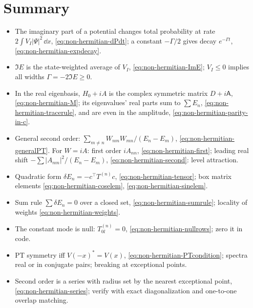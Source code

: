 \section{Summary}
\begin{itemize}
\item The imaginary part of a potential changes total probability at rate $2\int V_I|\Psi|^2\,\dd x$, \eqref{eq:non-hermitian-dPdt}; a constant $-\Gamma/2$ gives decay $e^{-\Gamma t}$, \eqref{eq:non-hermitian-expdecay}.
\item $\Im E$ is the state-weighted average of $V_I$, \eqref{eq:non-hermitian-ImE}; $V_I\le0$ implies all widths $\Gamma=-2\Im E\ge0$.
\item In the real eigenbasis, $H_0+iA$ is the complex symmetric matrix $D+i\mathsf A$, \eqref{eq:non-hermitian-M}; its eigenvalues' real parts sum to $\sum E_n$, \eqref{eq:non-hermitian-tracerule}, and are even in the amplitude, \eqref{eq:non-hermitian-parity-in-c}.
\item General second order: $\sum_{m\ne n}W_{nm}W_{mn}/(E_n-E_m)$, \eqref{eq:non-hermitian-generalPT}. For $W=iA$: first order $iA_{nn}$, \eqref{eq:non-hermitian-first}; leading real shift $-\sum|A_{nm}|^2/(E_n-E_m)$, \eqref{eq:non-hermitian-second}: level attraction.
\item Quadratic form $\delta E_n=-c^\top T^{(n)}c$, \eqref{eq:non-hermitian-tensor}; box matrix elements \eqref{eq:non-hermitian-coselem}, \eqref{eq:non-hermitian-sinelem}.
\item Sum rule $\sum\delta E_n=0$ over a closed set, \eqref{eq:non-hermitian-sumrule}; locality of weights \eqref{eq:non-hermitian-weights}.
\item The constant mode is null: $T^{(n)}_{0l}=0$, \eqref{eq:non-hermitian-nullrows}; zero it in code.
\item PT symmetry iff $V(-x)^*=V(x)$, \eqref{eq:non-hermitian-PTcondition}; spectra real or in conjugate pairs; breaking at exceptional points.
\item Second order is a series with radius set by the nearest exceptional point, \eqref{eq:non-hermitian-series}; verify with exact diagonalization and one-to-one overlap matching.
\end{itemize}

